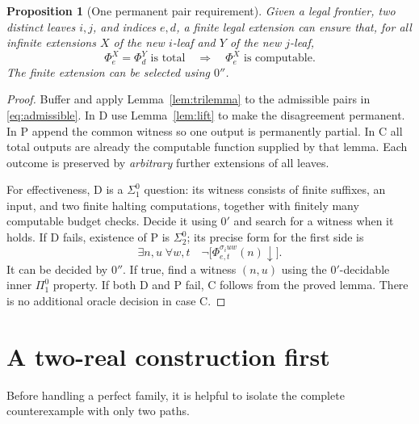 \documentclass[11pt,a4paper]{article}
\newtheorem{proposition}[theorem]{Proposition}
\theoremstyle{definition}\newtheorem{definition}[theorem]{Definition}
\theoremstyle{remark}\newtheorem{remark}[theorem]{Remark}
\begin{document}
\begin{proposition}[One permanent pair requirement]\label{prop:one-requirement}
Given a legal frontier, two distinct leaves $i,j$, and indices $e,d$, a finite
legal extension can ensure that, for all infinite extensions $X$ of the new
$i$-leaf and $Y$ of the new $j$-leaf,
\begin{equation}\label{eq:R}
  \Phi_e^X=\Phi_d^Y\text{ is total}
                 \quad\Longrightarrow\quad\Phi_e^X\text{ is computable}.
\end{equation}
The finite extension can be selected using $0''$.
\end{proposition}
\begin{proof}
Buffer and apply Lemma~\ref{lem:trilemma} to the admissible pairs in
\eqref{eq:admissible}. In D use Lemma~\ref{lem:lift} to make the disagreement
permanent. In P append the common witness so one output is permanently
partial. In C all total outputs are already the computable function supplied
by that lemma. Each outcome is preserved by \emph{arbitrary} further
extensions of all leaves.

For effectiveness, D is a $\Sigma^0_1$ question: its witness consists of
finite suffixes, an input, and two finite halting computations, together with
finitely many computable budget checks. Decide it using $0'$ and search for
a witness when it holds. If D fails, existence of P is $\Sigma^0_2$; its
precise form for the first side is
\[
 \exists n,u\;\forall w,t\quad
            \neg\bigl[\Phi_{e,t}^{\sigma_i u w}(n)\downarrow\bigr].
\]
It can be decided by $0''$. If true, find a witness $(n,u)$ using the
$0'$-decidable inner $\Pi^0_1$ property. If both D and P fail, C follows from
the proved lemma. There is no additional oracle decision in case C.
\end{proof}

\section{A two-real construction first}
\label{sec:pair}

Before handling a perfect family, it is helpful to isolate the complete
counterexample with only two paths.
\end{document}
